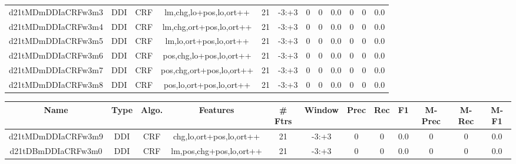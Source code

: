 \documentclass[a4paper]{article}
\begin{document}
\begin{landscape}
\begin{center}
\begin{tabular}{ |c|c|c|c|c|c|c|c|c|c|c|c|}
 
 	
 	\small{ d21tMDmDDIaCRFw3m3 } & \small{ DDI} & \small{  CRF }  & lm,chg,lo+pos,lo,ort++  &  21 &  \small{  -3:+3 }  &  0 & 0 & 0.0  &  0 & 0 & 0.0 \\
 	

 
 	
 	\small{ d21tMDmDDIaCRFw3m4 } & \small{ DDI} & \small{  CRF }  & lm,chg,ort+pos,lo,ort++  &  21 &  \small{  -3:+3 }  &  0 & 0 & 0.0  &  0 & 0 & 0.0 \\
 	

 
 	
 	\small{ d21tMDmDDIaCRFw3m5 } & \small{ DDI} & \small{  CRF }  & lm,lo,ort+pos,lo,ort++  &  21 &  \small{  -3:+3 }  &  0 & 0 & 0.0  &  0 & 0 & 0.0 \\
 	

 
 	
 	\small{ d21tMDmDDIaCRFw3m6 } & \small{ DDI} & \small{  CRF }  & pos,chg,lo+pos,lo,ort++  &  21 &  \small{  -3:+3 }  &  0 & 0 & 0.0  &  0 & 0 & 0.0 \\
 	

 
 	
 	\small{ d21tMDmDDIaCRFw3m7 } & \small{ DDI} & \small{  CRF }  & pos,chg,ort+pos,lo,ort++  &  21 &  \small{  -3:+3 }  &  0 & 0 & 0.0  &  0 & 0 & 0.0 \\
 	

 
 	
 	\small{ d21tMDmDDIaCRFw3m8 } & \small{ DDI} & \small{  CRF }  & pos,lo,ort+pos,lo,ort++  &  21 &  \small{  -3:+3 }  &  0 & 0 & 0.0  &  0 & 0 & 0.0 \\
 	
 \hline
\end{tabular}
\end{center}




\begin{center}
\begin{tabular}{ |c|c|c|c|c|c|c|c|c|c|c|c|} 
 \hline
 	Name & Type & Algo. & Features & \# Ftrs & Window & Prec & Rec & F1 & M-Prec & M-Rec & M-F1\\
 \hline

 	

 
 	
 	\small{ d21tMDmDDIaCRFw3m9 } & \small{ DDI} & \small{  CRF }  & chg,lo,ort+pos,lo,ort++  &  21 &  \small{  -3:+3 }  &  0 & 0 & 0.0  &  0 & 0 & 0.0 \\
 	

 
 	
 	\small{ d21tDBmDDIaCRFw3m0 } & \small{ DDI} & \small{  CRF }  & lm,pos,chg+pos,lo,ort++  &  21 &  \small{  -3:+3 }  &  0 & 0 & 0.0  &  0 & 0 & 0.0 \\
 	


\end{tabular}
\end{center}
\end{landscape}
\end{document}
